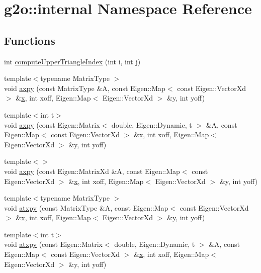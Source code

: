 \hypertarget{namespaceg2o_1_1internal}{}\section{g2o\+:\+:internal Namespace Reference}
\label{namespaceg2o_1_1internal}
\subsection*{Functions}
\begin{DoxyCompactItemize}
\item 
int \hyperlink{namespaceg2o_1_1internal_abf695a74f7aced7ee804a58607ae434c}{compute\+Upper\+Triangle\+Index} (int i, int j)
\item 
{\footnotesize template$<$typename Matrix\+Type $>$ }\\void \hyperlink{namespaceg2o_1_1internal_a3beb413c2d04c629c60a8ce5e05ddf8f}{axpy} (const Matrix\+Type \&A, const Eigen\+::\+Map$<$ const Eigen\+::\+Vector\+Xd $>$ \&\hyperlink{sparse__helper_8cpp_af88b946fb90d5f08b5fb740c70e98c10}{x}, int xoff, Eigen\+::\+Map$<$ Eigen\+::\+Vector\+Xd $>$ \&y, int yoff)
\item 
{\footnotesize template$<$int t$>$ }\\void \hyperlink{namespaceg2o_1_1internal_a0656fb61cd6302ea0e3bf5f99890c05a}{axpy} (const Eigen\+::\+Matrix$<$ double, Eigen\+::\+Dynamic, t $>$ \&A, const Eigen\+::\+Map$<$ const Eigen\+::\+Vector\+Xd $>$ \&\hyperlink{sparse__helper_8cpp_af88b946fb90d5f08b5fb740c70e98c10}{x}, int xoff, Eigen\+::\+Map$<$ Eigen\+::\+Vector\+Xd $>$ \&y, int yoff)
\item 
{\footnotesize template$<$$>$ }\\void \hyperlink{namespaceg2o_1_1internal_a6a7cd8c5afe2488e8deb0cbbfa878198}{axpy} (const Eigen\+::\+Matrix\+Xd \&A, const Eigen\+::\+Map$<$ const Eigen\+::\+Vector\+Xd $>$ \&\hyperlink{sparse__helper_8cpp_af88b946fb90d5f08b5fb740c70e98c10}{x}, int xoff, Eigen\+::\+Map$<$ Eigen\+::\+Vector\+Xd $>$ \&y, int yoff)
\item 
{\footnotesize template$<$typename Matrix\+Type $>$ }\\void \hyperlink{namespaceg2o_1_1internal_ad176878dff85b91f1dbabed52cbf696e}{atxpy} (const Matrix\+Type \&A, const Eigen\+::\+Map$<$ const Eigen\+::\+Vector\+Xd $>$ \&\hyperlink{sparse__helper_8cpp_af88b946fb90d5f08b5fb740c70e98c10}{x}, int xoff, Eigen\+::\+Map$<$ Eigen\+::\+Vector\+Xd $>$ \&y, int yoff)
\item 
{\footnotesize template$<$int t$>$ }\\void \hyperlink{namespaceg2o_1_1internal_a00b6a24b76a3fadc09136fe6232578ec}{atxpy} (const Eigen\+::\+Matrix$<$ double, Eigen\+::\+Dynamic, t $>$ \&A, const Eigen\+::\+Map$<$ const Eigen\+::\+Vector\+Xd $>$ \&\hyperlink{sparse__helper_8cpp_af88b946fb90d5f08b5fb740c70e98c10}{x}, int xoff, Eigen\+::\+Map$<$ Eigen\+::\+Vector\+Xd $>$ \&y, int yoff)

\end{DoxyCompactItemize}
